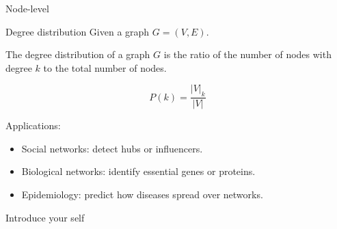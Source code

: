 \documentclass[aspectratio=169]{beamer}
\begin{document}
    \begin{frame}{Node-level}
        \begin{exampleblock}{Degree distribution}
            Given a graph $G = (V, E)$.
            
            The degree distribution of a graph $G$ is the ratio of the number of nodes with degree $k$ to the total number of nodes.
        \end{exampleblock}

        \begin{equation}
            P(k) = \frac{|V|_{k}}{|V|}
        \end{equation}
        
        Applications:
        \begin{itemize}
            \item Social networks: detect hubs or influencers.
            \item Biological networks:  identify essential genes or proteins.
            \item Epidemiology: predict how diseases spread over networks.
        \end{itemize}

        \begin{note}
            {Introduce your self}
        \end{note}
    \end{frame}
\end{document}
